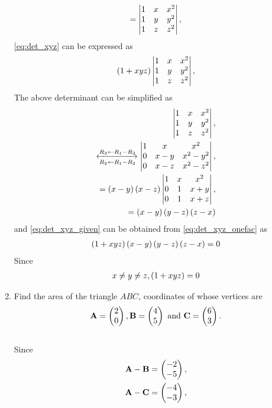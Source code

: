\documentclass[journal,12pt,twocolumn]{IEEEtran}
\renewcommand\thesection{\arabic{section}}
\begin{document}
\begin{enumerate}[label=\thesection.\arabic*.,ref=\thesection.\theenumi]
\begin{align}
	= 
	\begin{vmatrix}1 & x & x^2 \\ 1 & y & y^2 \\ 1 & z & z^2\end{vmatrix}, 
	\label{eq:det_xyz_12}
    \end{align}
	\eqref{eq:det_xyz} can be expressed as
\begin{align}
	\left(1+xyz\right)
	\begin{vmatrix}1 & x & x^2 \\ 1 & y & y^2 \\ 1 & z & z^2\end{vmatrix}, 
	\label{eq:det_xyz_onefac}
    \end{align}
    The above determinant can be simplified as
\begin{align}
	\begin{vmatrix}1 & x & x^2 \\ 1 & y & y^2 \\ 1 & z & z^2\end{vmatrix}, 
	\\
\xleftrightarrow[R_2 \leftarrow R_1 -R_2]{R_3 \leftarrow R_1 -R_3}
	\begin{vmatrix}1 & x & x^2 \\ 0 & x-y & x^2-y^2 \\ 0 & x-z & x^2-z^2\end{vmatrix}, 
	\\
	=
	\left(x-y\right)	\left(x-z\right)\begin{vmatrix}1 & x & x^2 \\ 0 & 1 & x+y \\ 0 & 1 & x+z\end{vmatrix}, 
	\\
	=
	\left(x-y\right)\left(y-z\right)	\left(z-x\right)
    \end{align}
	and \eqref{eq:det_xyz_given} can be obtained from 
	\eqref{eq:det_xyz_onefac} as
\begin{align}
	\left(1+xyz\right)
	\left(x-y\right)\left(y-z\right)	\left(z-x\right) = 0
    \end{align}
    Since 
\begin{align}
	x \ne y \ne z, 
	\left(1+xyz\right) = 0
    \end{align}
    \item   Find the area of the triangle $ABC$, coordinates of whose vertices are 
\begin{align}
	\mathbf{A} = \begin{pmatrix}2 \\0\end{pmatrix}, \mathbf{B} = \begin{pmatrix}4 \\5\end{pmatrix} \text{ and } \mathbf{C} = \begin{pmatrix}6 \\3\end{pmatrix}. 
    \end{align}
    \\
    \solution Since 
\begin{align}
	\mathbf{A}-\mathbf{B} &= \begin{pmatrix}-2 \\-5\end{pmatrix},
	\\
	\mathbf{A}-\mathbf{C} &= \begin{pmatrix}-4 \\-3\end{pmatrix},
    \end{align}

\end{enumerate}
\end{document}
